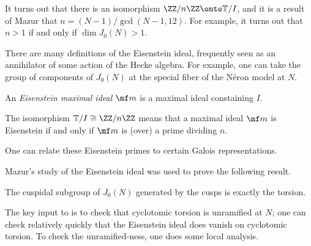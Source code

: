 \documentclass{article}
\begin{document}
\begin{remark}
	It turns out that there is an isomorphism $\ZZ/n\ZZ\onto\mathbb T/I$, and it is a result of Mazur that $n=(N-1)/\gcd(N-1,12)$. For example, it turns out that $n>1$ if and only if $\dim J_0(N)>1$.
\end{remark}
\begin{remark}
	There are many definitions of the Eisenstein ideal, frequently seen as an annihilator of some action of the Hecke algebra. For example, one can take the group of components of $J_0(N)$ at the special fiber of the N\'eron model at $N$.
\end{remark}
\begin{definition}
	An \textit{Eisenstein maximal ideal} $\mf m$ is a maximal ideal constaining $I$.
\end{definition}
\begin{remark}
	The isomorphism $\mathbb T/I\cong\ZZ/n\ZZ$ means that a maximal ideal $\mf m$ is Eisenstein if and only if $\mf m$ is (over) a prime dividing $n$.
\end{remark}
\begin{remark}
	One can relate these Eisenstein primes to certain Galois representations.
\end{remark}
Mazur's study of the Eisenstein ideal was used to prove the following result.
\begin{theorem}
	The cuspidal subgroup of $J_0(N)$ generated by the cusps is exactly the torsion.
\end{theorem}
\begin{remark}
	The key input to  is to check that cyclotomic torsion is unramified at $N$; one can check relatively quickly that the Eisenstein ideal does vanish on cyclotomic torsion. To check the unramified-ness, one does some local analysis.
\end{remark}
\end{document}
